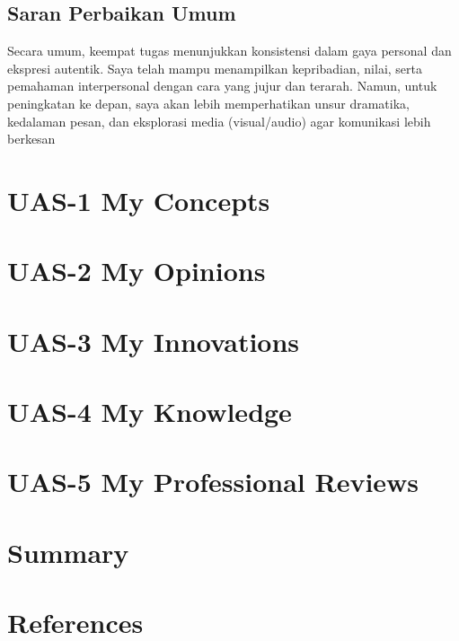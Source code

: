 \documentclass[
  letterpaper,
  DIV=11,
  numbers=noendperiod]{scrreprt}
\begin{document}
\section{Saran Perbaikan Umum}\label{saran-perbaikan-umum}

Secara umum, keempat tugas menunjukkan konsistensi dalam gaya personal
dan ekspresi autentik. Saya telah mampu menampilkan kepribadian, nilai,
serta pemahaman interpersonal dengan cara yang jujur dan terarah. Namun,
untuk peningkatan ke depan, saya akan lebih memperhatikan unsur
dramatika, kedalaman pesan, dan eksplorasi media (visual/audio) agar
komunikasi lebih berkesan


\chapter{UAS-1 My Concepts}\label{uas-1-my-concepts}


\chapter{UAS-2 My Opinions}\label{uas-2-my-opinions}


\chapter{UAS-3 My Innovations}\label{uas-3-my-innovations}


\chapter{UAS-4 My Knowledge}\label{uas-4-my-knowledge}


\chapter{UAS-5 My Professional
Reviews}\label{uas-5-my-professional-reviews}


\chapter{Summary}\label{summary}


\chapter*{References}\label{references}


\label{refs}
\end{document}
